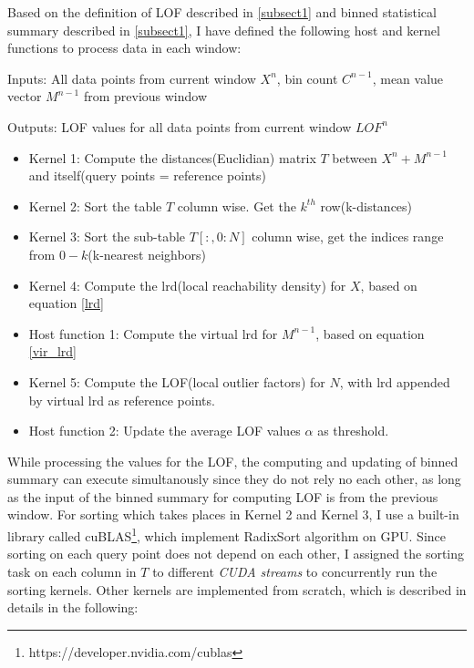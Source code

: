 \documentclass[11pt]{article}       %
\begin{document}
Based on the definition of LOF described in \ref{subsect1} and binned statistical summary described in \ref{subsect1}, I have defined the following host and kernel functions to process data in each window:

Inputs: All data points from current window $X^n$, bin count $C^{n-1}$, mean value vector $M^{n-1}$ from previous window

Outputs: LOF values for all data points from current window $LOF^n$ 

\begin{itemize}
	\item Kernel 1: Compute the distances(Euclidian) matrix $T$ between $X^n + M^{n-1}$ and itself(query points = reference points)
	\item Kernel 2: Sort the table $T$ column wise. Get the $k^{th}$ row(k-distances)
	\item Kernel 3: Sort the sub-table $T[:,0:N]$ column wise, get the indices range from $0 - k$(k-nearest neighbors)			
	\item Kernel 4: Compute the lrd(local reachability density) for $X$, based on equation \ref{lrd}
	\item Host function 1: Compute the virtual lrd for $M^{n-1}$, based on equation \ref{vir_lrd}
	\item Kernel 5: Compute the LOF(local outlier factors) for $N$, with lrd appended by virtual lrd as reference points.
	\item Host function 2: Update the average LOF values $\alpha$ as threshold.
\end{itemize}		

While processing the values for the LOF, the computing and updating of binned summary can execute simultanously since they do not rely no each other, as long as the input of the binned summary for computing LOF is from the previous window. For sorting which takes places in Kernel 2 and Kernel 3, I use a built-in library called cuBLAS\footnote{https://developer.nvidia.com/cublas}, which implement RadixSort algorithm on GPU. Since sorting on each query point does not depend on each other, I assigned the sorting task on each column in $T$ to different \textit{CUDA streams} to concurrently run the sorting kernels. Other kernels are implemented from scratch, which is described in details in the following:
\end{document}
